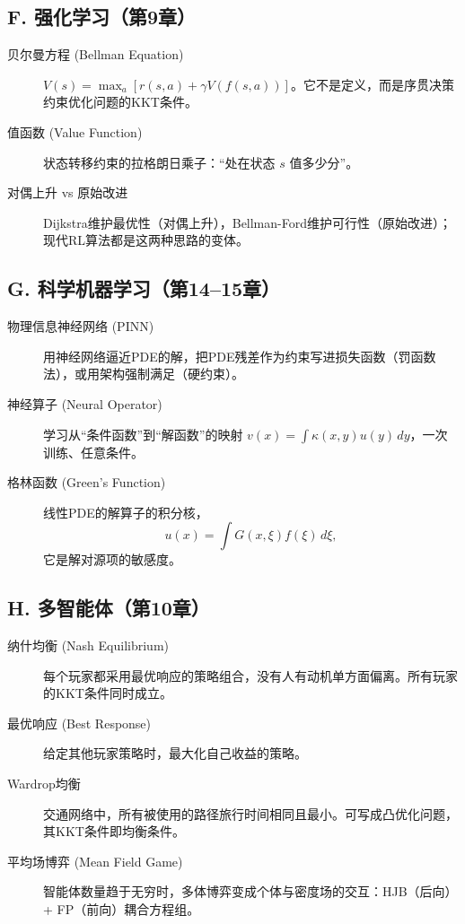 \subsection*{F. 强化学习（第9章）}

\begin{description}
    \item[贝尔曼方程 (Bellman Equation)]
    $V(s) = \max_a [r(s,a) + \gamma V(f(s,a))]$。它不是定义，而是序贯决策约束优化问题的KKT条件。

    \item[值函数 (Value Function)]
    状态转移约束的拉格朗日乘子：“处在状态 $s$ 值多少分”。

    \item[对偶上升 vs 原始改进]
    Dijkstra维护最优性（对偶上升），Bellman-Ford维护可行性（原始改进）；现代RL算法都是这两种思路的变体。
\end{description}

\subsection*{G. 科学机器学习（第14--15章）}

\begin{description}
    \item[物理信息神经网络 (PINN)]
    用神经网络逼近PDE的解，把PDE残差作为约束写进损失函数（罚函数法），或用架构强制满足（硬约束）。

    \item[神经算子 (Neural Operator)]
    学习从“条件函数”到“解函数”的映射 $v(x)=\int \kappa(x,y)u(y)\,dy$，一次训练、任意条件。

    \item[格林函数 (Green's Function)]
    线性PDE的解算子的积分核，
    \[ u(x)=\int G(x,\xi) f(\xi)\,d\xi, \]
    它是解对源项的敏感度。
\end{description}

\subsection*{H. 多智能体（第10章）}

\begin{description}
    \item[纳什均衡 (Nash Equilibrium)]
    每个玩家都采用最优响应的策略组合，没有人有动机单方面偏离。所有玩家的KKT条件同时成立。

    \item[最优响应 (Best Response)]
    给定其他玩家策略时，最大化自己收益的策略。

    \item[Wardrop均衡]
    交通网络中，所有被使用的路径旅行时间相同且最小。可写成凸优化问题，其KKT条件即均衡条件。

    \item[平均场博弈 (Mean Field Game)]
    智能体数量趋于无穷时，多体博弈变成个体与密度场的交互：HJB（后向）+ FP（前向）耦合方程组。
\end{description}


